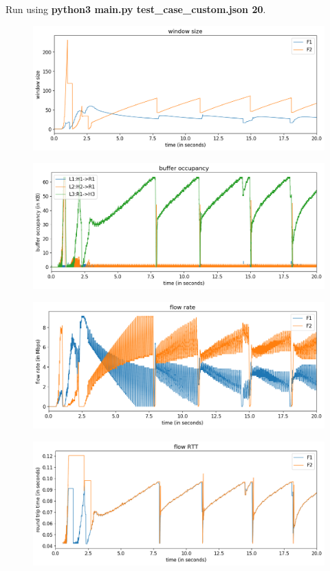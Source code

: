 \documentclass{article}
\begin{document}
Run using \textbf{python3 main.py test\_case\_custom.json 20}.

\begin{figure}[H]
\centering
\includegraphics[width = \textwidth]{"test_case_custom window size"}
\end{figure}

\begin{figure}[H]
\centering
\includegraphics[width = \textwidth]{"test_case_custom buffer occupancy"}
\end{figure}

\begin{figure}[H]
\centering
\includegraphics[width = \textwidth]{"test_case_custom flow rate"}
\end{figure}

\begin{figure}[H]
\centering
\includegraphics[width = \textwidth]{"test_case_custom flow RTT"}
\end{figure}
\end{document}
